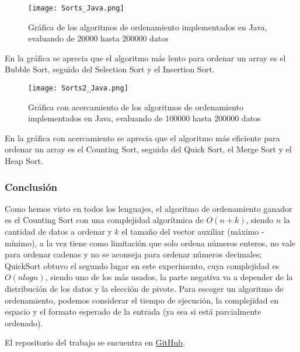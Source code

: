 \begin{itemize}
\begin{figure}[H]
	        \centering
	        \texttt{[image: Sorts\_Java.png]}
	        \caption{Gráfica de los algoritmos de ordenamiento implementados en Java, evaluando de 20000 hasta 200000 datos}
		\end{figure}
En la gráfica se aprecia que el algoritmo más lento para ordenar un array es el Bubble Sort, seguido del Selection Sort y el Insertion Sort.
        \begin{figure}[H]
	        \centering
	        \texttt{[image: Sorts2\_Java.png]}
	        \caption{Gráfica con acercamiento de los algoritmos de ordenamiento implementados en Java, evaluando de 100000 hasta 200000 datos}
		\end{figure}
En la gráfica con acercamiento se aprecia que el algoritmo más eficiente para ordenar un array es el Counting Sort, seguido del Quick Sort, el Merge Sort y el Heap Sort.
\end{itemize}

\subsubsection*{Conclusión}
Como hemos visto en todos los lenguajes, el algoritmo de ordenamiento ganador es el Counting Sort con una complejidad algorítmica de $O(n+k)$, siendo $n$ la cantidad de datos a ordenar y $k$ el tamaño del vector auxiliar (máximo - mínimo), a la vez tiene como limitación que solo ordena números enteros, no vale para ordenar cadenas y no se aconseja para ordenar números decimales; QuickSort obtuvo el segundo lugar en este experimento, cuya complejidad es $O(nlogn)$, siendo uno de los más usados, la parte negativa va a depender de la distribución de los datos y la elección de pivote.
Para escoger un algoritmo de ordenamiento, podemos considerar el tiempo de ejecución, la complejidad en espacio y el formato esperado de la entrada (ya sea si está parcialmente ordenado).

El repositorio del trabajo se encuentra en \href{https://github.com/syordya/CSUNSA-EDA}{GitHub}\cite{repo}.

\iffalse
Como se muestra en la figuras \ref{fig:act-1_a} y \ref{fig:act-1_b}.
\begin{figure}[H]
\centering
\begin{minipage}{0.45\textwidth}
  \centering
  \texttt{[image: act-1\_a]}
  \caption{Envío de \textit{ICMP ECHO REQUEST} de PC0 a PC1, PC2 y PC3.}
  \label{fig:act-1_a}
\end{minipage}\hfill
\begin{minipage}{0.45\textwidth}
  \centering
  \texttt{[image: act-1\_b]}
  \caption{Respuesta de PC1, PC2 y PC3. Tabla ARP de PC0.}
  \label{fig:act-1_b}
\end{minipage}
\end{figure}
Como se muestra en la figura \ref{fig:act-3}
\begin{figure}[H]
  \centering
  \texttt{[image: act-3]}
  \caption{Tabla de subneteo para la red 192.168.100.0.}
  \label{fig:act-3}
\end{figure}
\fi